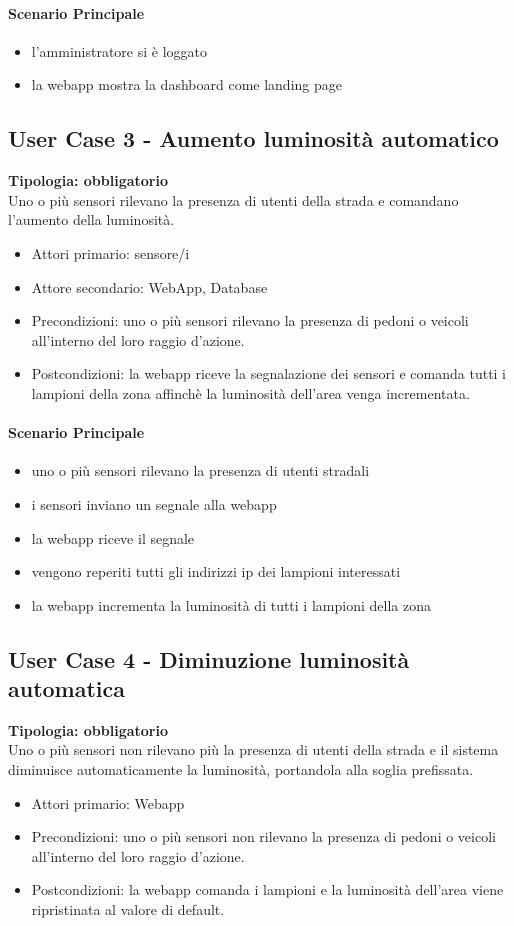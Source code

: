 \documentclass[12pt]{article}
\begin{document}
\paragraph{Scenario Principale}
\begin{itemize}
	\item l'amministratore si è loggato
	\item la webapp mostra la dashboard come landing page
\end{itemize}

\subsection{User Case 3 - Aumento luminosità automatico}
\textbf{Tipologia: obbligatorio}\\
Uno o più sensori rilevano la presenza di utenti della strada e comandano l'aumento della luminosità.
\begin{itemize}
	\item Attori primario: sensore/i
	\item Attore secondario: WebApp, Database
	\item Precondizioni: uno o più sensori rilevano la presenza di pedoni o veicoli all'interno del loro raggio d'azione.
	\item Postcondizioni: la webapp riceve la segnalazione dei sensori e comanda tutti i lampioni della zona affinchè la luminosità dell'area venga incrementata.
\end{itemize}
\paragraph{Scenario Principale}
\begin{itemize}
	\item uno o più sensori rilevano la presenza di utenti stradali
	\item i sensori inviano un segnale alla webapp
	\item la webapp riceve il segnale
	\item vengono reperiti tutti gli indirizzi ip dei lampioni interessati
	\item la webapp incrementa la luminosità di tutti i lampioni della zona
\end{itemize}

\subsection{User Case 4 - Diminuzione luminosità automatica}
\textbf{Tipologia: obbligatorio}\\
Uno o più sensori non rilevano più la presenza di utenti della strada e il sistema diminuisce automaticamente la luminosità, portandola alla soglia prefissata.
\begin{itemize}
	\item Attori primario: Webapp
	\item Precondizioni: uno o più sensori non rilevano la presenza di pedoni o veicoli all'interno del loro raggio d'azione.
	\item Postcondizioni: la webapp comanda i lampioni e la luminosità dell'area viene ripristinata al valore di default.
\end{itemize}
\end{document}
